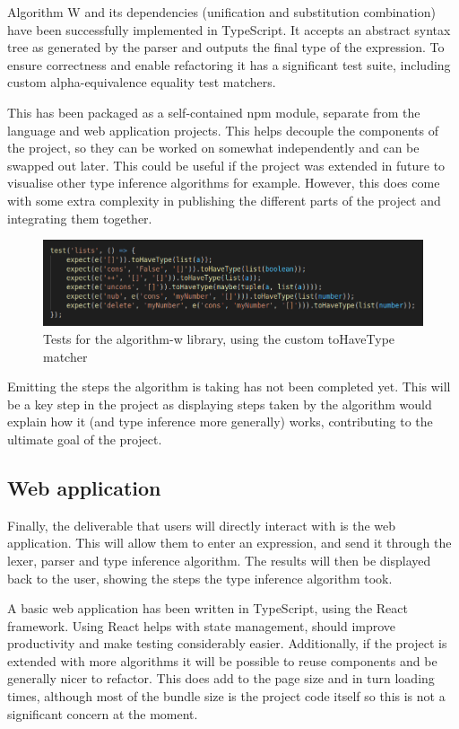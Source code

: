 \documentclass[a4paper,fleqn,12pt]{article}
\begin{document}
Algorithm W and its dependencies (unification and substitution combination) have been successfully implemented in TypeScript. It accepts an abstract syntax tree as generated by the parser and outputs the final type of the expression. To ensure correctness and enable refactoring it has a significant test suite, including custom alpha-equivalence equality test matchers.

This has been packaged as a self-contained npm module, separate from the language and web application projects. This helps decouple the components of the project, so they can be worked on somewhat independently and can be swapped out later. This could be useful if the project was extended in future to visualise other type inference algorithms for example. However, this does come with some extra complexity in publishing the different parts of the project and integrating them together.

\begin{figure}[h!]
  \centering
  \includegraphics[width=1.000\linewidth]{images/image2.png}
  \caption{Tests for the algorithm-w library, using the custom toHaveType matcher}
\end{figure}

Emitting the steps the algorithm is taking has not been completed yet. This will be a key step in the project as displaying steps taken by the algorithm would explain how it (and type inference more generally) works, contributing to the ultimate goal of the project.

\subsection{Web application}\label{id:h.cwlbt58wsbeg}

Finally, the deliverable that users will directly interact with is the web application. This will allow them to enter an expression, and send it through the lexer, parser and type inference algorithm. The results will then be displayed back to the user, showing the steps the type inference algorithm took.

A basic web application has been written in TypeScript, using the React framework. Using React helps with state management, should improve productivity and make testing considerably easier. Additionally, if the project is extended with more algorithms it will be possible to reuse components and be generally nicer to refactor. This does add to the page size and in turn loading times, although most of the bundle size is the project code itself so this is not a significant concern at the moment.
\end{document}
